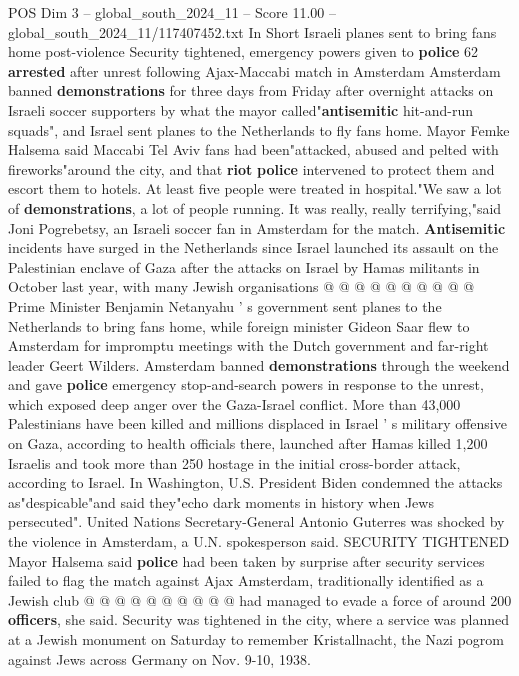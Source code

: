 \begin{textsample}{POS Dim 3 – global\_south\_2024\_11 – Score 11.00 – global\_south\_2024\_11/117407452.txt}  \label{ex:f3_pos_321}
In Short Israeli planes sent to bring fans home post-violence Security tightened, emergency powers given to \textbf{police} 62 \textbf{arrested} after unrest following Ajax-Maccabi match in Amsterdam Amsterdam banned \textbf{demonstrations} for three days from Friday after overnight attacks on Israeli soccer supporters by what the mayor called"\textbf{antisemitic} hit-and-run squads", and Israel sent planes to the Netherlands to fly fans home.
Mayor Femke Halsema said Maccabi Tel Aviv fans had been"attacked, abused and pelted with fireworks"around the city, and that \textbf{riot} \textbf{police} intervened to protect them and escort them to hotels.
At least five people were treated in hospital."We saw a lot of \textbf{demonstrations}, a lot of people running.
It was really, really terrifying,"said Joni Pogrebetsy, an Israeli soccer fan in Amsterdam for the match. \textbf{Antisemitic} incidents have surged in the Netherlands since Israel launched its assault on the Palestinian enclave of Gaza after the attacks on Israel by Hamas militants in October last year, with many Jewish organisations @ @ @ @ @ @ @ @ @ @ Prime Minister Benjamin Netanyahu ' s government sent planes to the Netherlands to bring fans home, while foreign minister Gideon Saar flew to Amsterdam for impromptu meetings with the Dutch government and far-right leader Geert Wilders.
Amsterdam banned \textbf{demonstrations} through the weekend and gave \textbf{police} emergency stop-and-search powers in response to the unrest, which exposed deep anger over the Gaza-Israel conflict.
More than 43,000 Palestinians have been killed and millions displaced in Israel ' s military offensive on Gaza, according to health officials there, launched after Hamas killed 1,200 Israelis and took more than 250 hostage in the initial cross-border attack, according to Israel.
In Washington, U.S.
President Biden condemned the attacks as"despicable"and said they"echo dark moments in history when Jews persecuted".
United Nations Secretary-General Antonio Guterres was shocked by the violence in Amsterdam, a U.N. spokesperson said.
SECURITY TIGHTENED Mayor Halsema said \textbf{police} had been taken by surprise after security services failed to flag the match against Ajax Amsterdam, traditionally identified as a Jewish club @ @ @ @ @ @ @ @ @ @ had managed to evade a force of around 200 \textbf{officers}, she said.
Security was tightened in the city, where a service was planned at a Jewish monument on Saturday to remember Kristallnacht, the Nazi pogrom against Jews across Germany on Nov. 9-10, 1938.

\end{textsample}

